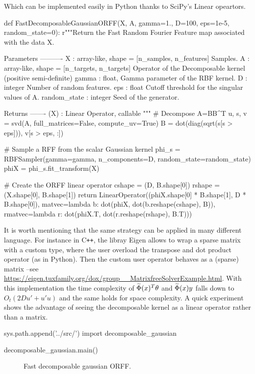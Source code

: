 Which can be implemented easily in Python thanks to SciPy's Linear opeartors.
\begin{pyblock}
def FastDecomposableGaussianORFF(X, A, gamma=1.,
                                 D=100, eps=1e-5, random_state=0):
    r"""Return the Fast Random Fourier Feature map associated with the data X.

    Parameters
    ----------
    X : {array-like}, shape = [n_samples, n_features]
        Samples.
    A : {array-like}, shape = [n_targets, n_targets]
        Operator of the Decomposable kernel (positive semi-definite)
    gamma : {float},
        Gamma parameter of the RBF kernel.
    D : {integer}
        Number of random features.
    eps : {float}
        Cutoff threshold for the singular values of A.
    random_state : {integer}
        Seed of the generator.

    Returns
    -------
    \tilde{\Phi}(X) : Linear Operator, callable
    """
    # Decompose A=BB^T
    u, s, v = svd(A, full_matrices=False, compute_uv=True)
    B = dot(diag(sqrt(s[s > eps])), v[s > eps, :])

    # Sample a RFF from the scalar Gaussian kernel
    phi_s = RBFSampler(gamma=gamma, n_components=D, random_state=random_state)
    phiX = phi_s.fit_transform(X)

    # Create the ORFF linear operator
    cshape = (D, B.shape[0])
    rshape = (X.shape[0], B.shape[1])
    return LinearOperator((phiX.shape[0] * B.shape[1], D * B.shape[0]),
                          matvec=lambda b: dot(phiX, dot(b.reshape(cshape),
                                               B)),
                          rmatvec=lambda r: dot(phiX.T, dot(r.reshape(rshape),
                                                B.T)))
\end{pyblock}
It is worth mentioning that the same strategy can be applied in many different language. For instance in C{}\verb!++!, the libray Eigen \cite{eigenweb} allows to wrap a sparse matrix with a custom type, where the user overload the transpose and dot product operator (as in Python). Then the custom user operator behaves as a (sparse) matrix --see \url{https://eigen.tuxfamily.org/dox/group__MatrixfreeSolverExample.html}. With this implementation the time complexity of $\widetilde{\Phi}(x)^T\theta$ and $\widetilde{\Phi}(x)y$ falls down to $O_t(2Du'+u'u)$ and the same holds for space complexity. A quick experiment shows the advantage of seeing the decomposable kernel as a linear operator rather than a matrix.
\begin{pycode}
sys.path.append('../src/')
import decomposable_gaussian

decomposable_gaussian.main()
\end{pycode}
\begin{figure}[htb]
\caption[Fast decomposable gaussian ORFF]{Fast decomposable gaussian ORFF.}
\label{fig:fast_decomposable_gaussian}
\end{figure}


